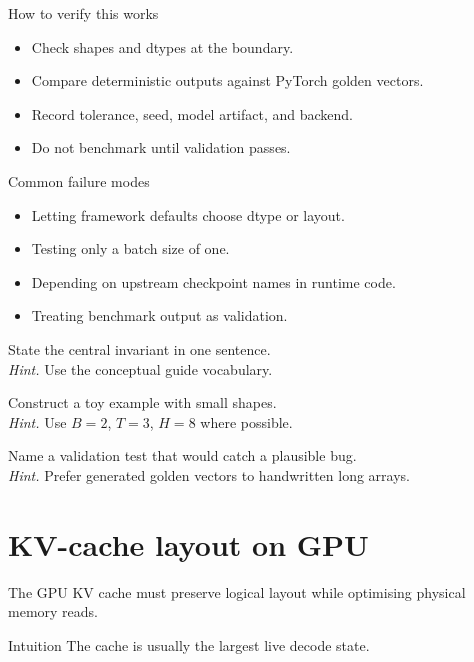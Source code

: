 \begin{verificationbox}{How to verify this works}
\begin{itemize}
\item Check shapes and dtypes at the boundary.
\item Compare deterministic outputs against PyTorch golden vectors.
\item Record tolerance, seed, model artifact, and backend.
\item Do not benchmark until validation passes.
\end{itemize}
\end{verificationbox}

\begin{warningbox}{Common failure modes}
\begin{itemize}
\item Letting framework defaults choose dtype or layout.
\item Testing only a batch size of one.
\item Depending on upstream checkpoint names in runtime code.
\item Treating benchmark output as validation.
\end{itemize}
\end{warningbox}

\begin{chapterexercises}
\item State the central invariant in one sentence.\\
\textit{Hint.} Use the conceptual guide vocabulary.
\item Construct a toy example with small shapes.\\
\textit{Hint.} Use $B=2$, $T=3$, $H=8$ where possible.
\item Name a validation test that would catch a plausible bug.\\
\textit{Hint.} Prefer generated golden vectors to handwritten long arrays.
\end{chapterexercises}

\chapter{KV-cache layout on GPU}
\label{ch:gpu-cache-layout}
The GPU KV cache must preserve logical layout while optimising physical memory reads.



\begin{intuitionbox}{Intuition}
The cache is usually the largest live decode state.
\end{intuitionbox}

